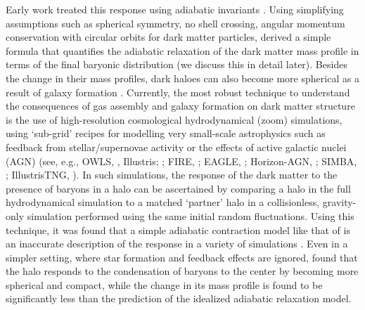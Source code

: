 Early work treated this response using adiabatic invariants
\citep[][]{osti6457593,1984MNRAS.211..753B,1986ApJ...301...27B,1987ApJ...318...15R}. 
Using simplifying assumptions such as spherical symmetry, no shell crossing, angular momentum conservation with circular orbits for dark matter particles, \citet[][]{1986ApJ...301...27B} derived a simple formula that quantifies the adiabatic relaxation of the dark matter mass profile in terms of the final baryonic distribution (we discuss this in detail later). Besides the change in their mass profiles, dark haloes can also become more spherical as a result of galaxy formation \citep[][]{1994ApJ...431..617D}.
Currently, the most robust technique to understand the consequences of gas assembly and galaxy formation on dark matter structure is the use of high-resolution cosmological hydrodynamical (zoom) simulations, using `sub-grid' recipes for modelling very small-scale astrophysics such as feedback from stellar/supernovae activity or the effects of active galactic nuclei (AGN) (see, e.g., OWLS, \citealp{2010MNRAS.402.1536S}, Illustris; \citealp{2014MNRAS.445..175G}; FIRE, \citealp{2014MNRAS.445..581H}; EAGLE, \citealp{2015MNRAS.446..521S}; Horizon-AGN,
\citealp[][]{2017MNRAS.467.4739K}; SIMBA,
\citealp[][]{2019MNRAS.486.2827D}; IllustrisTNG, \citealp{2019ComAC...6....2N}). In such simulations, the response of the dark matter to the presence of baryons in a halo can be ascertained by comparing a halo in the full hydrodynamical simulation to a matched `partner' halo in a collisionless, gravity-only simulation performed using the same initial random fluctuations. 
Using this technique, it was found that a simple adiabatic contraction model like that of \citet[][]{1986ApJ...301...27B} is an inaccurate description of the response in a variety of simulations \citep[see, e.g.,][]{2004ApJ...616...16G,2006PhRvD..74l3522G,2010MNRAS.402..776P,2010MNRAS.406..922T,2010MNRAS.405.2161D,2010MNRAS.407..435A,2011MNRAS.414..195T,2016MNRAS.461.2658D,2019A&A...622A.197A,2022MNRAS.511.3910F}. Even in a simpler setting, where star formation and feedback effects are ignored, \citet{2010MNRAS.407..435A} found that the halo responds to the condensation of baryons to the center by becoming more spherical and compact, while the change in its mass profile is found to be significantly less than the prediction of the idealized adiabatic relaxation model.


